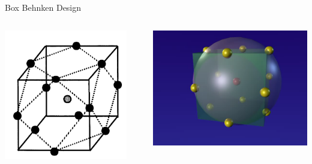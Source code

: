 \documentclass[14pt]{beamer}
\begin{document}
\begin{frame}{Box Behnken Design}
\pause
\begin{columns}
    \begin{column}{0.5\textwidth}
      \includegraphics[width=0.9\textwidth]{BBD.png}
    \end{column}
    \pause
    \begin{column}{0.5\textwidth}
      \includegraphics[width=\textwidth]{BBD3D.png}
    \end{column}
  \end{columns}
\end{frame}
\end{document}
